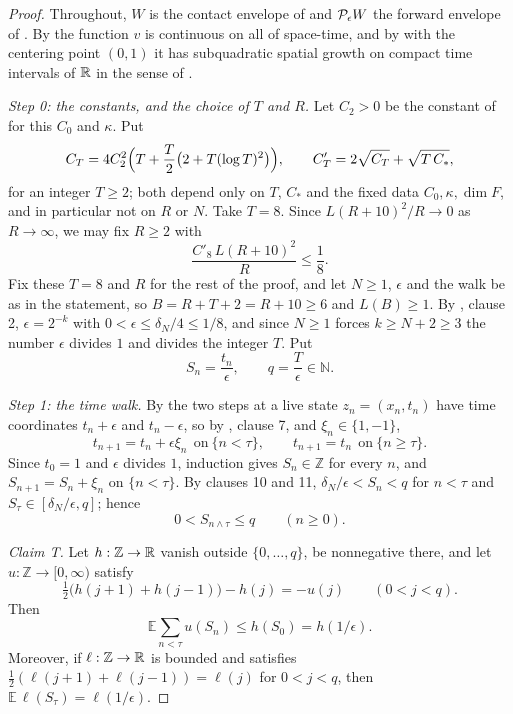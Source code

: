 \begin{proof}
Throughout, $W$ is the contact envelope of  and
$\mathcal{P}_\epsilon W$ the forward envelope of . By
 the function $v$ is continuous on all of space-time, and by
 with the centering point $(0,1)$ it has
subquadratic spatial growth on compact time intervals of $\mathbb{R}$ in the sense of
.

\emph{Step 0: the constants, and the choice of $T$ and $R$.}
Let $C_2>0$ be the constant of  for this $C_0$ and
$\kappa$. Put
\[
  C_T=4C_2^2\Bigl(T+\frac{T}{2}\bigl(2+T(\log T)^2\bigr)\Bigr),\qquad
  C'_T=2\sqrt{C_T}+\sqrt{T\,C_*},
\]
for an integer $T\ge2$; both depend only on $T$, $C_*$ and the fixed data
$C_0,\kappa,\dim F$, and in particular not on $R$ or $N$. Take $T=8$. Since
$L(R+10)^2/R\to0$ as $R\to\infty$, we may fix $R\ge2$ with
\begin{equation}\label{eq:swt-choiceR}
  \frac{C'_8\,L(R+10)^2}{R}\le\frac18 .
\end{equation}
Fix these $T=8$ and $R$ for the rest of the proof, and let $N\ge1$,
$\epsilon$ and the walk be as in the statement, so $B=R+T+2=R+10\ge6$ and
$L(B)\ge1$. By , clause 2, $\epsilon=2^{-k}$ with
$0<\epsilon\le\delta_N/4\le1/8$, and since $N\ge1$ forces $k\ge N+2\ge3$ the
number $\epsilon$ divides $1$ and divides the integer $T$. Put
\[
  S_n=\frac{t_n}{\epsilon},\qquad q=\frac{T}{\epsilon}\in\mathbb N .
\]

\emph{Step 1: the time walk.}
By  the two steps at a live state $z_n=(x_n,t_n)$ have time
coordinates $t_n+\epsilon$ and $t_n-\epsilon$, so by ,
clause 7, and $\xi_n\in\{1,-1\}$,
\begin{equation}\label{eq:swt-timestep}
  t_{n+1}=t_n+\epsilon\xi_n\ \ \text{on}\ \{n<\tau\},\qquad
  t_{n+1}=t_n\ \ \text{on}\ \{n\ge\tau\}.
\end{equation}
Since $t_0=1$ and $\epsilon$ divides $1$, induction gives $S_n\in\mathbb Z$ for
every $n$, and $S_{n+1}=S_n+\xi_n$ on $\{n<\tau\}$. By clauses 10 and 11,
$\delta_N/\epsilon<S_n<q$ for $n<\tau$ and $S_\tau\in[\delta_N/\epsilon,q]$;
hence
\begin{equation}\label{eq:swt-range}
  0<S_{n\wedge\tau}\le q\qquad(n\ge0).
\end{equation}

\emph{Claim T.} Let $h:\mathbb Z\to\mathbb{R}$ vanish outside $\{0,\ldots,q\}$, be
nonnegative there, and let $u:\mathbb Z\to[0,\infty)$ satisfy
\begin{equation}\label{eq:swt-poisson}
  \tfrac12\bigl(h(j+1)+h(j-1)\bigr)-h(j)=-u(j)\qquad(0<j<q).
\end{equation}
Then
\[
  \mathbb E\sum_{n<\tau}u(S_n)\le h(S_0)=h(1/\epsilon).
\]
Moreover, if $\ell:\mathbb Z\to\mathbb{R}$ is bounded and satisfies
$\tfrac12(\ell(j+1)+\ell(j-1))=\ell(j)$ for $0<j<q$, then
$\mathbb E\,\ell(S_\tau)=\ell(1/\epsilon)$.


\end{proof}
